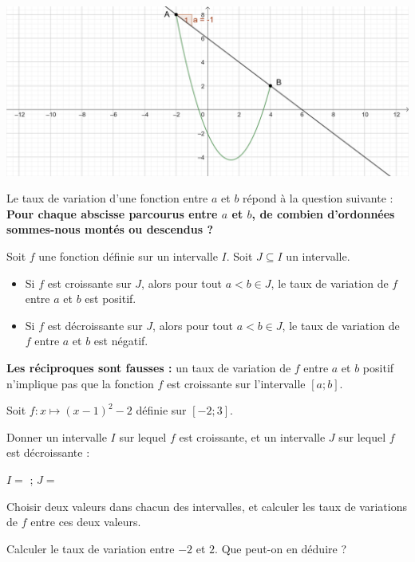 \documentclass{article}
\begin{document}
\begin{center}
\includegraphics[width=\textwidth]{Taux_variation_pente.png}
\end{center}
\begin{remark}
Le taux de variation d'une fonction entre $a$ et $b$ répond à la question suivante : \textbf{Pour chaque abscisse parcourus entre $a$ et $b$, de combien d'ordonnées sommes-nous montés ou descendus ?}
\end{remark}
\begin{tcolorbox}
\begin{proposition}
Soit $f$ une fonction définie sur un intervalle $I$. Soit $J \subseteq I$ un intervalle.
\begin{itemize}
\item Si $f$ est croissante sur $J$, alors pour tout $a < b \in J$, le taux de variation de $f$ entre $a$ et $b$ est positif.  
\item Si $f$ est décroissante sur $J$, alors pour tout $a < b \in J$, le taux de variation de $f$ entre $a$ et $b$ est négatif.  
\end{itemize}
\end{proposition}
\end{tcolorbox}
\begin{remark}
\textbf{Les réciproques sont fausses :} un taux de variation de $f$ entre $a$ et $b$ positif n'implique pas que la fonction $f$ est croissante sur l'intervalle $[a;b]$.
\end{remark}
\begin{example}
Soit $f \colon x \mapsto (x-1)^2 - 2$ définie sur $[-2;3]$.
\begin{enumquestions}
\item Donner un intervalle $I$ sur lequel $f$ est croissante, et un intervalle $J$ sur lequel $f$ est décroissante : 

$I =$ \answersline; $J = $ \answersline
\item Choisir deux valeurs dans chacun des intervalles, et calculer les taux de variations de $f$ entre ces deux valeurs.

\answersline
\item Calculer le taux de variation entre $-2$ et $2$. Que peut-on en déduire ? \answersline
\end{enumquestions} 
\end{example}
\end{document}
